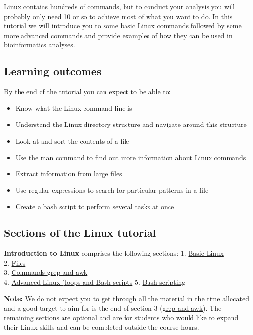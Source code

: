 \documentclass[11pt]{article}
\providecommand{\tightlist}{%
      \setlength{\itemsep}{0pt}\setlength{\parskip}{0pt}}
\begin{document}
Linux contains hundreds of commands, but to conduct your analysis you
will probably only need 10 or so to achieve most of what you want to do.
In this tutorial we will introduce you to some basic Linux commands
followed by some more advanced commands and provide examples of how they
can be used in bioinformatics analyses.

\hypertarget{learning-outcomes}{%
\subsection{Learning outcomes}\label{learning-outcomes}}

By the end of the tutorial you can expect to be able to:

\begin{itemize}
\tightlist
\item
  Know what the Linux command line is
\item
  Understand the Linux directory structure and navigate around this
  structure
\item
  Look at and sort the contents of a file
\item
  Use the man command to find out more information about Linux commands
\item
  Extract information from large files
\item
  Use regular expressions to search for particular patterns in a file
\item
  Create a bash script to perform several tasks at once
\end{itemize}

\hypertarget{sections-of-the-linux-tutorial}{%
\subsection{Sections of the Linux
tutorial}\label{sections-of-the-linux-tutorial}}

\textbf{Introduction to Linux} comprises the following sections: 1.
\href{basic.ipynb}{Basic Linux}\\
2. \href{files.ipynb}{Files}\\
3. \href{grep_and_awk.ipynb}{Commands grep and awk}\\
4. \href{advanced_linux.ipynb}{Advanced Linux (loops and Bash scripts}
5. \href{bash.ipynb}{Bash scripting}

\textbf{Note:} We do not expect you to get through all the material in
the time allocated and a good target to aim for is the end of section 3
(\href{grep_and_awk.ipynb}{grep and awk}). The remaining sections are
optional and are for students who would like to expand their Linux
skills and can be completed outside the course hours.
\end{document}
